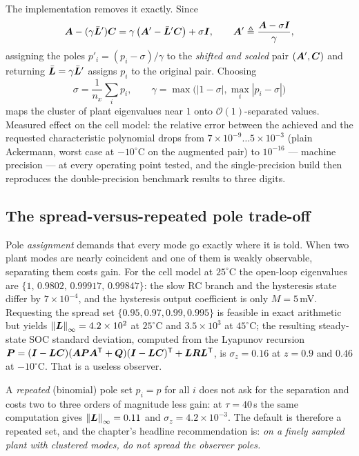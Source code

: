 The implementation removes it exactly.  Since
\begin{equation}
\bm{A} - (\gamma \bar{\bm{L}}')\bm{C} = \gamma\left(\bm{A}' - \bar{\bm{L}}'\bm{C}\right) + \sigma \bm{I} ,
\qquad \bm{A}' \triangleq \frac{\bm{A} - \sigma\bm{I}}{\gamma},
\label{eq:lue-shift}
\end{equation}
assigning the poles $p'_i = (p_i-\sigma)/\gamma$ to the \emph{shifted and scaled} pair
$(\bm{A}',\bm{C})$ and returning $\bar{\bm{L}} = \gamma\bar{\bm{L}}'$ assigns $p_i$ to the original pair.
Choosing
\begin{equation}
\sigma = \frac{1}{n_x}\sum_i p_i , \qquad
\gamma = \max\Big( |1-\sigma| , \max_i |p_i - \sigma| \Big)
\label{eq:lue-shiftchoice}
\end{equation}
maps the cluster of plant eigenvalues near $1$ onto $\mathcal{O}(1)$-separated values.  Measured
effect on the cell model: the relative error between the achieved and the requested
characteristic polynomial drops from $7\times10^{-9}\ldots5\times10^{-3}$ (plain Ackermann,
worst case at $-10^\circ$C on the augmented pair) to $10^{-16}$ --- machine precision --- at
every operating point tested, and the single-precision build then reproduces the
double-precision benchmark results to three digits.

\subsection{The spread-versus-repeated pole trade-off}
\label{sec:lue-spread}
Pole \emph{assignment} demands that every mode go exactly where it is told.  When two plant
modes are nearly coincident and one of them is weakly observable, separating them costs gain.
For the cell model at $25^\circ$C the open-loop eigenvalues are
$\{1,\,0.9802,\,0.99917,\,0.99847\}$: the slow RC branch and the hysteresis state differ by
$7\times10^{-4}$, and the hysteresis output coefficient is only $M = 5$\,mV.  Requesting the
spread set $\{0.95,0.97,0.99,0.995\}$ is feasible in exact arithmetic but yields
$\left\lVert \bm{L} \right\rVert_\infty = 4.2\times 10^{2}$ at $25^\circ$C and $3.5\times 10^{3}$ at $45^\circ$C; the
resulting steady-state SOC standard deviation, computed from the Lyapunov recursion
$\bm{P} = (\bm{I}-\bm{L}\bm{C})(\bm{A}\bm{P}\bm{A}^{\mathsf{T}}+\bm{Q})(\bm{I}-\bm{L}\bm{C})^{\mathsf{T}} + \bm{L}\bm{R}\bm{L}^{\mathsf{T}}$, is
$\sigma_z = 0.16$ at $z=0.9$ and $0.46$ at $-10^\circ$C.  That is a useless observer.

A \emph{repeated} (binomial) pole set $p_i = p$ for all $i$ does not ask for the separation and
costs two to three orders of magnitude less gain: at $\tau = 40$\,s the same computation gives
$\left\lVert \bm{L} \right\rVert_\infty = 0.11$ and $\sigma_z = 4.2\times10^{-3}$.  The default is therefore a
repeated set, and the chapter's headline recommendation is: \emph{on a finely sampled plant with
clustered modes, do not spread the observer poles.}


